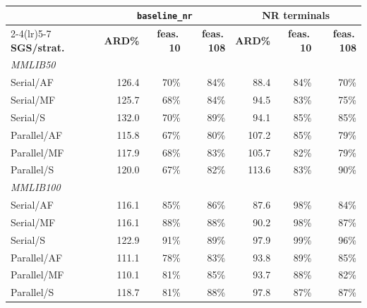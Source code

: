 \begin{table}[htbp]
  \centering
  \small
  \caption[Full 108-class re-evaluation, NR conditions]{}
  \label{tab:full108-nr}
  \begin{tabular}{lrrrrrr}
    \toprule
    & \multicolumn{3}{c}{\textbf{\texttt{baseline\_nr}}}
    & \multicolumn{3}{c}{\textbf{NR terminals}} \\
    \cmidrule(lr){2-4}\cmidrule(lr){5-7}
    \textbf{SGS/strat.} & \textbf{ARD\%} & \textbf{feas.\,10}
    & \textbf{feas.\,108} & \textbf{ARD\%} & \textbf{feas.\,10}
    & \textbf{feas.\,108} \\
    \midrule
    \multicolumn{7}{l}{\textit{MMLIB50}} \\
    Serial/AF   & 126.4 & 70\% & 84\% & 88.4  & 84\% & 70\% \\
    Serial/MF   & 125.7 & 68\% & 84\% & 94.5  & 83\% & 75\% \\
    Serial/S    & 132.0 & 70\% & 89\% & 94.1  & 85\% & 85\% \\
    Parallel/AF & 115.8 & 67\% & 80\% & 107.2 & 85\% & 79\% \\
    Parallel/MF & 117.9 & 68\% & 83\% & 105.7 & 82\% & 79\% \\
    Parallel/S  & 120.0 & 67\% & 82\% & 113.6 & 83\% & 90\% \\
    \midrule
    \multicolumn{7}{l}{\textit{MMLIB100}} \\
    Serial/AF   & 116.1 & 85\% & 86\% & 87.6  & 98\% & 84\% \\
    Serial/MF   & 116.1 & 88\% & 88\% & 90.2  & 98\% & 87\% \\
    Serial/S    & 122.9 & 91\% & 89\% & 97.9  & 99\% & 96\% \\
    Parallel/AF & 111.1 & 78\% & 83\% & 93.8  & 89\% & 85\% \\
    Parallel/MF & 110.1 & 81\% & 85\% & 93.7  & 88\% & 82\% \\
    Parallel/S  & 118.7 & 81\% & 88\% & 97.8  & 87\% & 87\% \\
    \bottomrule
  \end{tabular}
\end{table}

